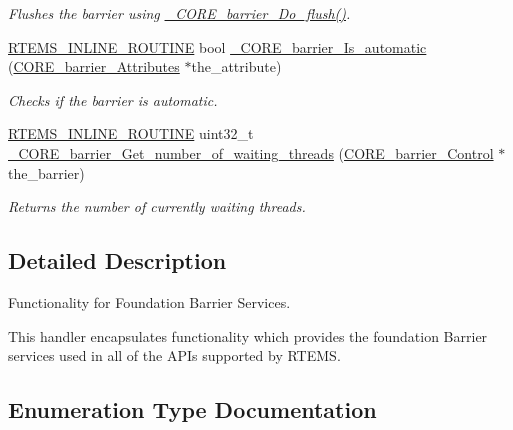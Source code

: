 \begin{DoxyCompactItemize}
\begin{DoxyCompactList}\small\item\em Flushes the barrier using \mbox{\hyperlink{group__RTEMSScoreBarrier_gaed6c59e37b0d953329d63da8cbdc99ee}{\+\_\+\+C\+O\+R\+E\+\_\+barrier\+\_\+\+Do\+\_\+flush()}}. \end{DoxyCompactList}\item 
\mbox{\hyperlink{group__RTEMSScoreBaseDefs_gac216239df231d5dbd15e3520b0b9313f}{R\+T\+E\+M\+S\+\_\+\+I\+N\+L\+I\+N\+E\+\_\+\+R\+O\+U\+T\+I\+NE}} bool \mbox{\hyperlink{group__RTEMSScoreBarrier_ga6b8d2207e81aa4b1e1d8240f5c644dea}{\+\_\+\+C\+O\+R\+E\+\_\+barrier\+\_\+\+Is\+\_\+automatic}} (\mbox{\hyperlink{structCORE__barrier__Attributes}{C\+O\+R\+E\+\_\+barrier\+\_\+\+Attributes}} $\ast$the\+\_\+attribute)
\begin{DoxyCompactList}\small\item\em Checks if the barrier is automatic. \end{DoxyCompactList}\item 
\mbox{\hyperlink{group__RTEMSScoreBaseDefs_gac216239df231d5dbd15e3520b0b9313f}{R\+T\+E\+M\+S\+\_\+\+I\+N\+L\+I\+N\+E\+\_\+\+R\+O\+U\+T\+I\+NE}} uint32\+\_\+t \mbox{\hyperlink{group__RTEMSScoreBarrier_ga62cae8e40a4efc51139292463698e7ad}{\+\_\+\+C\+O\+R\+E\+\_\+barrier\+\_\+\+Get\+\_\+number\+\_\+of\+\_\+waiting\+\_\+threads}} (\mbox{\hyperlink{structCORE__barrier__Control}{C\+O\+R\+E\+\_\+barrier\+\_\+\+Control}} $\ast$the\+\_\+barrier)
\begin{DoxyCompactList}\small\item\em Returns the number of currently waiting threads. \end{DoxyCompactList}\end{DoxyCompactItemize}


\subsection{Detailed Description}
Functionality for Foundation Barrier Services. 

This handler encapsulates functionality which provides the foundation Barrier services used in all of the A\+P\+Is supported by R\+T\+E\+MS. 

\subsection{Enumeration Type Documentation}
\mbox{\label{group__RTEMSScoreBarrier_ga48a30f464f6a44bf727e3958a3c0e822}} 
